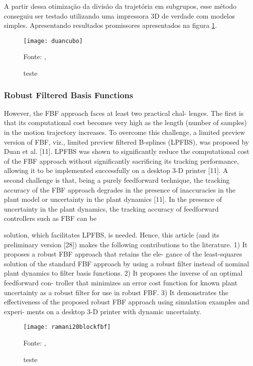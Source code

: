 A partir dessa otimização da divisão da trajetória em subgrupos, esse método
conseguiu ser testado utilizando uma impressora 3D de verdade com modelos simples.
Apresentando resultados promissores apresentados na figura \ref{fig:duancubo}.

\begin{figure}[!htb]
    \centering
    \caption{teste}
    \texttt{[image: duancubo]}

    {\footnotesize Fonte: \citeauthor{duan18}, \citeyear{duan18}}
    \label{fig:duancubo}
\end{figure}

\subsubsection{Robust Filtered Basis Functions}

However, the FBF approach faces at least two practical chal-
lenges. The first is that its computational cost becomes very
high as the length (number of samples) in the motion trajectory
increases. To overcome this challenge, a limited preview version
of FBF, viz., limited preview filtered B-splines (LPFBS), was
proposed by Duan et al. [11]. LPFBS was shown to significantly
reduce the computational cost of the FBF approach without
significantly sacrificing its tracking performance, allowing it to
be implemented successfully on a desktop 3-D printer [11]. A
second challenge is that, being a purely feedforward technique,
the tracking accuracy of the FBF approach degrades in the
presence of inaccuracies in the plant model or uncertainty in
the plant dynamics [11].
In the presence of uncertainty in the plant dynamics, the
tracking accuracy of feedforward controllers such as FBF can be

solution, which facilitates LPFBS, is needed.
Hence, this article (and its preliminary version [28]) makes
the following contributions to the literature.
1) It proposes a robust FBF approach that retains the ele-
gance of the least-squares solution of the standard FBF
approach by using a robust filter instead of nominal plant
dynamics to filter basis functions.
2) It proposes the inverse of an optimal feedforward con-
troller that minimizes an error cost function for known
plant uncertainty as a robust filter for use in robust FBF.
3) It demonstrates the effectiveness of the proposed robust
FBF approach using simulation examples and experi-
ments on a desktop 3-D printer with dynamic uncertainty.
\cite{ramani20}


\begin{figure}[!htb]
    \centering
    \caption{teste}
    \texttt{[image: ramani20blockfbf]}

    {\footnotesize Fonte: \citeauthor{ramani20}, \citeyear{ramani20}}
    \label{fig:label9}
\end{figure}

